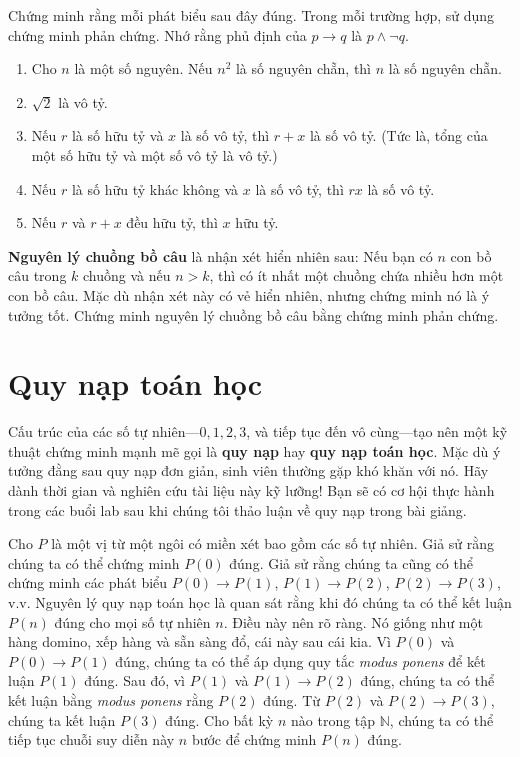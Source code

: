\begin{exercise}
Chứng minh rằng mỗi phát biểu sau đây đúng. Trong mỗi trường hợp, sử dụng chứng minh phản chứng. Nhớ rằng phủ định của $p \to q$ là $p \wedge \neg q$.
\begin{enumerate}[label=\alph*)]
\item Cho $n$ là một số nguyên. Nếu $n^2$ là số nguyên chẵn, thì $n$ là số nguyên chẵn.
\item $\sqrt{2}$ là vô tỷ.
\item Nếu $r$ là số hữu tỷ và $x$ là số vô tỷ, thì $r + x$ là số vô tỷ. (Tức là, tổng của một số hữu tỷ và một số vô tỷ là vô tỷ.)
\item Nếu $r$ là số hữu tỷ khác không và $x$ là số vô tỷ, thì $rx$ là số vô tỷ.
\item Nếu $r$ và $r + x$ đều hữu tỷ, thì $x$ hữu tỷ.
\end{enumerate}
\end{exercise}

\begin{exercise}
\textbf{Nguyên lý chuồng bồ câu} là nhận xét hiển nhiên sau: Nếu bạn có $n$ con bồ câu trong $k$ chuồng và nếu $n > k$, thì có ít nhất một chuồng chứa nhiều hơn một con bồ câu. Mặc dù nhận xét này có vẻ hiển nhiên, nhưng chứng minh nó là ý tưởng tốt. Chứng minh nguyên lý chuồng bồ câu bằng chứng minh phản chứng.
\end{exercise}

\section{Quy nạp toán học}

Cấu trúc của các số tự nhiên---$0, 1, 2, 3$, và tiếp tục đến vô cùng---tạo nên một kỹ thuật chứng minh mạnh mẽ gọi là \textbf{quy nạp} hay \textbf{quy nạp toán học}. Mặc dù ý tưởng đằng sau quy nạp đơn giản, sinh viên thường gặp khó khăn với nó. Hãy dành thời gian và nghiên cứu tài liệu này kỹ lưỡng! Bạn sẽ có cơ hội thực hành trong các buổi lab sau khi chúng tôi thảo luận về quy nạp trong bài giảng.

Cho $P$ là một vị từ một ngôi có miền xét bao gồm các số tự nhiên. Giả sử rằng chúng ta có thể chứng minh $P(0)$ đúng. Giả sử rằng chúng ta cũng có thể chứng minh các phát biểu $P(0) \to P(1)$, $P(1) \to P(2)$, $P(2) \to P(3)$, v.v. Nguyên lý quy nạp toán học là quan sát rằng khi đó chúng ta có thể kết luận $P(n)$ đúng cho mọi số tự nhiên $n$. Điều này nên rõ ràng. Nó giống như một hàng domino, xếp hàng và sẵn sàng đổ, cái này sau cái kia. Vì $P(0)$ và $P(0) \to P(1)$ đúng, chúng ta có thể áp dụng quy tắc \emph{modus ponens} để kết luận $P(1)$ đúng. Sau đó, vì $P(1)$ và $P(1) \to P(2)$ đúng, chúng ta có thể kết luận bằng \emph{modus ponens} rằng $P(2)$ đúng. Từ $P(2)$ và $P(2) \to P(3)$, chúng ta kết luận $P(3)$ đúng. Cho bất kỳ $n$ nào trong tập $\mathbb{N}$, chúng ta có thể tiếp tục chuỗi suy diễn này $n$ bước để chứng minh $P(n)$ đúng.

